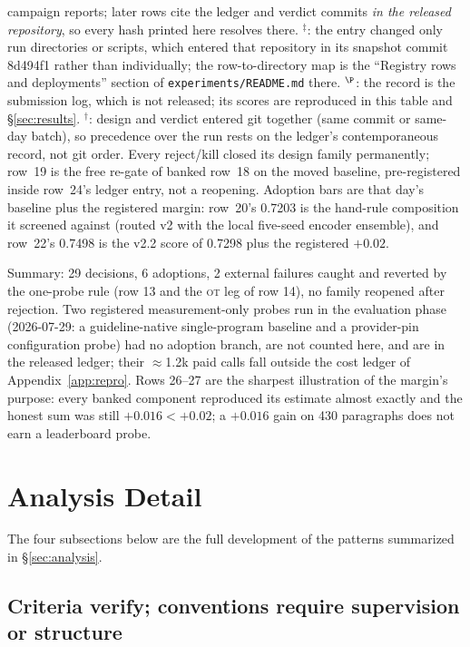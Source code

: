 \documentclass[11pt]{article}
\newcommand{\lab}[1]{\textsc{#1}}
\newcommand{\ot}{\lab{ot}}
\begin{document}
\begin{table}[t]
{campaign reports; later rows cite the ledger and verdict commits
\emph{in the released repository}, so every hash printed here resolves
there. $^{\ddagger}$: the entry changed only run directories or scripts,
which entered that repository in its snapshot commit 8d494f1 rather than
individually; the row-to-directory map is the ``Registry rows and
deployments'' section of \texttt{experiments/README.md} there. $^{\P}$:
the record is the submission log, which is not released; its scores are
reproduced in this table and \S\ref{sec:results}. $^{\dagger}$: design and verdict entered git
together (same commit or same-day batch), so precedence over the run
rests on the ledger's contemporaneous record, not git order. Every
reject/kill closed its design family permanently; row~19 is the free
re-gate of banked row~18 on the moved baseline, pre-registered inside
row~24's ledger entry, not a reopening. Adoption bars are that day's baseline plus the registered
margin: row~20's 0.7203 is the hand-rule composition it screened against
(routed v2 with the local five-seed encoder ensemble), and row~22's
0.7498 is the v2.2 score of 0.7298 plus the registered $+0.02$.}
\label{tab:registry}
\end{table}

Summary: 29 decisions, 6 adoptions, 2 external failures caught and
reverted by the one-probe rule (row 13 and the \ot{} leg of row 14), no
family reopened after rejection. Two registered measurement-only probes
run in the evaluation phase (2026-07-29: a guideline-native
single-program baseline and a provider-pin configuration probe) had no
adoption branch, are not counted here, and are in the released ledger;
their ${\approx}$1.2k paid calls fall outside the cost ledger of
Appendix~\ref{app:repro}. Rows 26--27 are the sharpest illustration of the
margin's purpose: every banked component reproduced its estimate almost
exactly and the honest sum was still $+0.016 < +0.02$; a $+0.016$ gain on
430 paragraphs does not earn a leaderboard probe.

\section{Analysis Detail}
\label{app:analysis}

The four subsections below are the full development of the patterns
summarized in \S\ref{sec:analysis}.

\subsection{Criteria verify; conventions require supervision or structure}
\label{sec:criteria}
\end{document}
